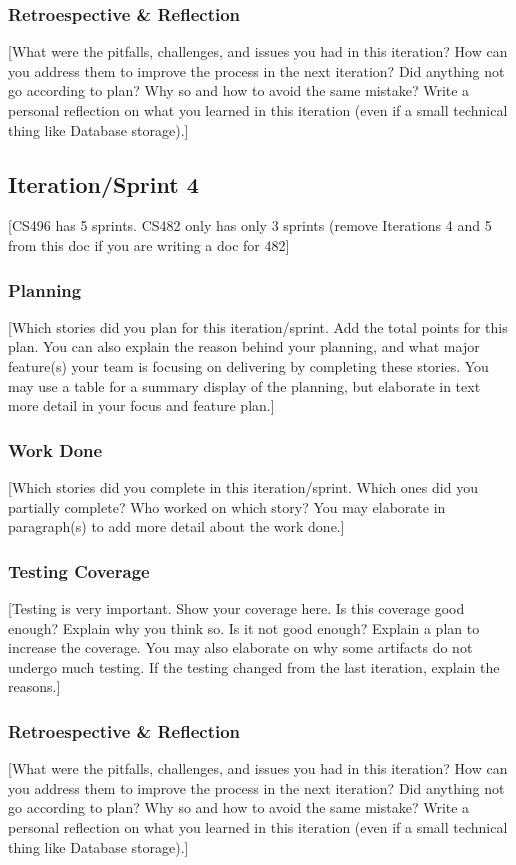 \documentclass{article}
\begin{document}
\subsubsection{Retroespective \& Reflection}
[What were the pitfalls, challenges, and issues you had in this iteration? How can you address them to improve the process in the next iteration? Did anything not go according to plan? Why so and how to avoid the same mistake? Write a personal reflection on what you learned in this iteration (even if a small technical thing like Database storage).]

\subsection{Iteration/Sprint 4}
[CS496 has 5 sprints. CS482 only has only 3 sprints (remove Iterations 4 and 5 from this doc if you are writing a doc for 482]

\subsubsection{Planning}
[Which stories did you plan for this iteration/sprint. Add the total points for this plan. You can also explain the reason behind your planning, and what major feature(s) your team is focusing on delivering by completing these stories. You may use a table for a summary display of the planning, but elaborate in text more detail in your focus and feature plan.]

\subsubsection{Work Done}
[Which stories did you complete in this iteration/sprint. Which ones did you partially complete? Who worked on which story? You may elaborate in paragraph(s) to add more detail about the work done.]

\subsubsection{Testing Coverage}
[Testing is very important. Show your coverage here. Is this coverage good enough? Explain why you think so. Is it not good enough? Explain a plan to increase the coverage. You may also elaborate on why some artifacts do not undergo much testing. If the testing changed from the last iteration, explain the reasons.]

\subsubsection{Retroespective \& Reflection}
[What were the pitfalls, challenges, and issues you had in this iteration? How can you address them to improve the process in the next iteration? Did anything not go according to plan? Why so and how to avoid the same mistake? Write a personal reflection on what you learned in this iteration (even if a small technical thing like Database storage).]
\end{document}
